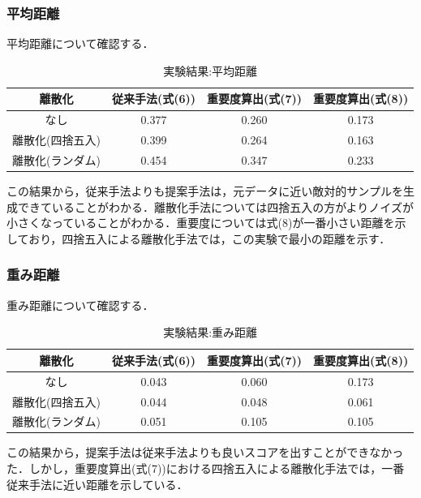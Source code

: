 \subsubsection{平均距離}
平均距離について確認する．
\begin{table}[H]
    \centering
    \caption{実験結果:平均距離}
    \begin{tabular}{|c|c|c|c|} \hline
        離散化 & 従来手法(式(6)) & 重要度算出(式(7)) & 重要度算出(式(8)) \\ \hline
        なし & 0.377 & 0.260 & 0.173 \\ \hline
        離散化(四捨五入) & 0.399 & 0.264 & 0.163 \\ \hline
        離散化(ランダム) & 0.454 & 0.347 & 0.233 \\ \hline
    \end{tabular}
\end{table}
この結果から，従来手法よりも提案手法は，元データに近い敵対的サンプルを生成できていることがわかる．離散化手法については四捨五入の方がよりノイズが小さくなっていることがわかる．重要度については式(8)が一番小さい距離を示しており，四捨五入による離散化手法では，この実験で最小の距離を示す．

\subsubsection{重み距離}
重み距離について確認する．
\begin{table}[H]
    \centering
    \caption{実験結果:重み距離}
    \begin{tabular}{|c|c|c|c|} \hline
        離散化 & 従来手法(式(6)) & 重要度算出(式(7)) & 重要度算出(式(8)) \\ \hline
        なし & 0.043 & 0.060 & 0.173\\ \hline
        離散化(四捨五入) & 0.044 & 0.048 & 0.061 \\ \hline
        離散化(ランダム) & 0.051 & 0.105 & 0.105 \\ \hline
    \end{tabular}
\end{table}
この結果から，提案手法は従来手法よりも良いスコアを出すことができなかった．しかし，重要度算出(式(7))における四捨五入による離散化手法では，一番従来手法に近い距離を示している．

